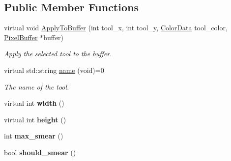 \subsection*{Public Member Functions}
\begin{DoxyCompactItemize}
\item 
virtual void \hyperlink{classimage__tools_1_1Tool_a5427081ae4c0a20427bad3deb39e5857}{Apply\+To\+Buffer} (int tool\+\_\+x, int tool\+\_\+y, \hyperlink{classimage__tools_1_1ColorData}{Color\+Data} tool\+\_\+color, \hyperlink{classimage__tools_1_1PixelBuffer}{Pixel\+Buffer} $\ast$buffer)
\begin{DoxyCompactList}\small\item\em Apply the selected tool to the buffer. \end{DoxyCompactList}\item 
virtual std\+::string \hyperlink{classimage__tools_1_1Tool_a251c179e3ac9756d08fbcd082750f8a9}{name} (void)=0
\begin{DoxyCompactList}\small\item\em The name of the tool. \end{DoxyCompactList}\item 
virtual int {\bfseries width} ()\hypertarget{classimage__tools_1_1Tool_a70a671fbda82c746468e1a0c5c898c08}{}\label{classimage__tools_1_1Tool_a70a671fbda82c746468e1a0c5c898c08}

\item 
virtual int {\bfseries height} ()\hypertarget{classimage__tools_1_1Tool_ae1a7d1d03e2128da512ef20c294bfca9}{}\label{classimage__tools_1_1Tool_ae1a7d1d03e2128da512ef20c294bfca9}

\item 
int {\bfseries max\+\_\+smear} ()\hypertarget{classimage__tools_1_1Tool_adc29d68691b4d2013c9814cd79cfd36f}{}\label{classimage__tools_1_1Tool_adc29d68691b4d2013c9814cd79cfd36f}

\item 
bool {\bfseries should\+\_\+smear} ()\hypertarget{classimage__tools_1_1Tool_a3247e5e36cb8aa534bc751ca30bef954}{}\label{classimage__tools_1_1Tool_a3247e5e36cb8aa534bc751ca30bef954}

\end{DoxyCompactItemize}
